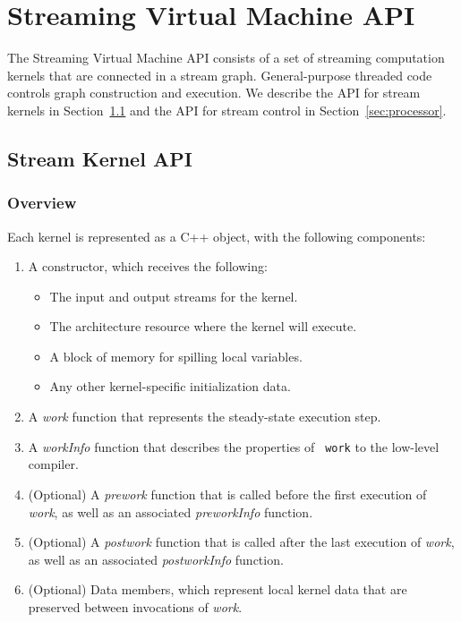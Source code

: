 \section{Streaming Virtual Machine API}

The Streaming Virtual Machine API consists of a set of streaming
computation kernels that are connected in a stream graph.
General-purpose threaded code controls graph construction and
execution.  We describe the API for stream kernels in
Section~\ref{sec:kernel} and the API for stream control in
Section~\ref{sec:processor}.

\subsection{Stream Kernel API}
\label{sec:kernel}

\subsubsection{Overview}

Each kernel is represented as a C++ object, with the following
components:

\begin{enumerate}

\item A constructor, which receives the following:

\begin{itemize}
\item The input and output streams for the kernel.
\item The architecture resource where the kernel will execute.
\item A block of memory for spilling local variables.
\item Any other kernel-specific initialization data.
\end{itemize}

\item A {\it work} function that represents the steady-state execution
step.

\item A {\it workInfo} function that describes the properties of {\tt
work} to the low-level compiler.

\item (Optional) A {\it prework} function that is called before the
first execution of {\it work}, as well as an associated {\it
preworkInfo} function.

\item (Optional) A {\it postwork} function that is called after the
last execution of {\it work}, as well as an associated {\it
postworkInfo} function.

\item (Optional) Data members, which represent local kernel data that
are preserved between invocations of {\it work}.

\end{enumerate}

